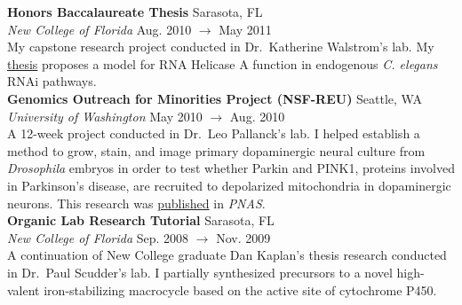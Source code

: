 \documentclass[a4paper,12pt]{article}
\newcommand{\ressubheading}[4]{
        \textbf{#1} \hfill #2\\
        \textit{#3} \hfill #4 \\}
\begin{document}
    \ressubheading{Honors Baccalaureate Thesis}{Sarasota, FL}{New College of Florida}{Aug. 2010 $\rightarrow$ May 2011}
   My capstone research project conducted in Dr.\ Katherine Walstrom's lab.  My \hyperlink{thesispub}{thesis} proposes a model for RNA Helicase A function in endogenous \emph{C. elegans} RNAi pathways.\\ %


    \ressubheading{Genomics Outreach for Minorities Project (NSF-REU)}{Seattle, WA}{University of Washington}{May 2010 $\rightarrow$ Aug. 2010}
    A 12-week project conducted in Dr.\ Leo Pallanck's lab. I helped establish a method to grow, stain, and image primary dopaminergic neural culture from \textit{Drosophila} embryos in order to test whether Parkin and PINK1, proteins involved in Parkinson's disease, are recruited to depolarized mitochondria in dopaminergic neurons. This research was \hyperlink{neuronpub}{published} in \textit{PNAS}.\\


    \ressubheading{Organic Lab Research Tutorial}{Sarasota, FL}{New College of Florida}{Sep. 2008 $\rightarrow$ Nov. 2009}
    A continuation of New College graduate Dan Kaplan's thesis research conducted in Dr.\ Paul Scudder's lab. I partially synthesized precursors to a novel high-valent iron-stabilizing macrocycle based on the active site of cytochrome P450.\\%
\end{document}
